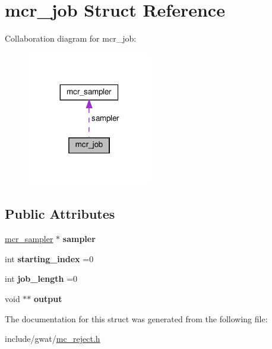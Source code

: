 \hypertarget{structmcr__job}{}\section{mcr\+\_\+job Struct Reference}
\label{structmcr__job}


Collaboration diagram for mcr\+\_\+job\+:\nopagebreak
\begin{figure}[H]
\begin{center}
\leavevmode
\includegraphics[width=155pt]{structmcr__job__coll__graph}
\end{center}
\end{figure}
\subsection*{Public Attributes}
\begin{DoxyCompactItemize}
\item 
\mbox{\label{structmcr__job_a8016c242228440211dd8e0fdfd8cb1f7}} 
\hyperlink{classmcr__sampler}{mcr\+\_\+sampler} $\ast$ {\bfseries sampler}
\item 
\mbox{\label{structmcr__job_a6f2dd320a49729257b6d075e1cce4e23}} 
int {\bfseries starting\+\_\+index} =0
\item 
\mbox{\label{structmcr__job_a590d489d391127ad426893819e37c671}} 
int {\bfseries job\+\_\+length} =0
\item 
\mbox{\label{structmcr__job_a027d799fdf34fb5aaa60d3c801b31cab}} 
void $\ast$$\ast$ {\bfseries output}
\end{DoxyCompactItemize}


The documentation for this struct was generated from the following file\+:\begin{DoxyCompactItemize}
\item 
include/gwat/\hyperlink{mc__reject_8h}{mc\+\_\+reject.\+h}\end{DoxyCompactItemize}
